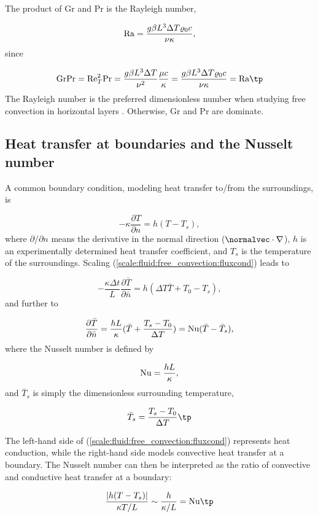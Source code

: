 \documentclass[graybox,envcountchap,sectrefs,final]{svmonodo}
\begin{document}
The product of Gr and Pr is the Rayleigh number,

\[
\hbox{Ra} = \frac{g\beta L^3\Delta T\varrho_0 c}{\nu\kappa},
\]
since

\[
\hbox{Gr} \hbox{Pr} = \hbox{Re}_T^2\hbox{Pr} =
\frac{g\beta L^3 \Delta T}{\nu^2}\frac{\mu c}{\kappa} =
\frac{g\beta L^3 \Delta T\varrho_0 c}{\nu\kappa} =
\hbox{Ra}\tp
\]
The Rayleigh number is the preferred dimensionless number when studying
free convection in horizontal layers \cite{Drazin_Reid,Tritton}. Otherwise,
Gr and Pr are dominate.


\subsection{Heat transfer at boundaries and the Nusselt number}


A common boundary condition, modeling heat transfer to/from the
surroundings, is

\begin{equation}
-\kappa\frac{\partial T}{\partial n} = h(T - T_s),
\label{scale:fluid:free_convection:fluxcond}
\end{equation}
where $\partial/\partial n$ means the derivative in the normal direction
($\normalvec\cdot\nabla$), $h$ is an experimentally determined
heat transfer coefficient, and $T_s$ is the temperature of
the surroundings. Scaling (\ref{scale:fluid:free_convection:fluxcond})
leads to

\[ -\frac{\kappa\Delta t}{L}\frac{\partial \bar T}{\partial \bar n} = h(\Delta T \bar T + T_0 - T_s),\]
and further to

\[ \frac{\partial \bar T}{\partial \bar n} =
\frac{hL}{\kappa}(\bar T + \frac{T_s - T_0}{\Delta T})
= \hbox{Nu}(\bar T - \bar T_s),
\]
where the Nusselt number is defined by

\[ \hbox{Nu} = \frac{hL}{\kappa},\]
and $\bar T_s$ is simply the dimensionless surrounding temperature,

\[ \bar T_s = \frac{T_s - T_0}{\Delta T}\tp\]

The left-hand side of (\ref{scale:fluid:free_convection:fluxcond}) represents
heat conduction, while the right-hand side models convective heat
transfer at a boundary. The Nusselt number can then be interpreted as
the ratio of convective and conductive heat transfer at a boundary:

\[ \frac{|h(T-T_s)|}{\kappa T/L} \sim \frac{h}{\kappa /L} = \hbox{Nu}\tp\]
\end{document}

